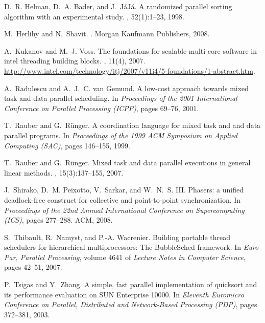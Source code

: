 \documentclass[preprint]{sigplanconf}
\begin{document}
\begin{thebibliography}{10}
D.~R. Helman, D.~A. Bader, and J.~J{\'a}J{\'a}.
\newblock A randomized parallel sorting algorithm with an experimental study.
,
  52(1):1--23, 1998.

M.~Herlihy and N.~Shavit.
.
\newblock Morgan Kaufmann Publishers, 2008.

A.~Kukanov and M.~J. Voss.
\newblock The foundations for scalable multi-core software in intel threading
  building blocks.
, 11(4), 2007.
\newblock
  \url{http://www.intel.com/technology/itj/2007/v11i4/5-foundations/1-abstract.htm}.

A.~Radulescu and A.~J.~C. van Gemund.
\newblock A low-cost approach towards mixed task and data parallel scheduling.
\newblock In {\em Proceedings of the 2001 International Conference on Parallel
  Processing ({ICPP})}, pages 69--76, 2001.

T.~Rauber and G.~R{\"u}nger.
\newblock A coordination language for mixed task and and data parallel
  programs.
\newblock In {\em Proceedings of the 1999 {ACM} Symposium on Applied Computing
  ({SAC})}, pages 146--155, 1999.

T.~Rauber and G.~R{\"u}nger.
\newblock Mixed task and data parallel executions in general linear methods.
, 15(3):137--155, 2007.

J.~Shirako, D.~M. Peixotto, V.~Sarkar, and W.~N.~S. III.
\newblock Phasers: a unified deadlock-free construct for collective and
  point-to-point synchronization.
\newblock In {\em Proceedings of the 22nd Annual International Conference on
  Supercomputing ({ICS})}, pages 277--288. ACM, 2008.

S.~Thibault, R.~Namyst, and P.-A. Wacrenier.
\newblock Building portable thread schedulers for hierarchical multiprocessors:
  The {BubbleSched} framework.
\newblock In {\em Euro-Par, Parallel Processing}, volume 4641 of {\em {L}ecture
  {N}otes in {C}omputer {S}cience}, pages 42--51, 2007.

P.~Tsigas and Y.~Zhang.
\newblock A simple, fast parallel implementation of quicksort and its
  performance evaluation on {SUN} {Enterprise} 10000.
\newblock In {\em Eleventh Euromicro Conference on Parallel, Distributed and
  Network-Based Processing ({PDP})}, pages 372--381, 2003.

\end{thebibliography}
\end{document}
